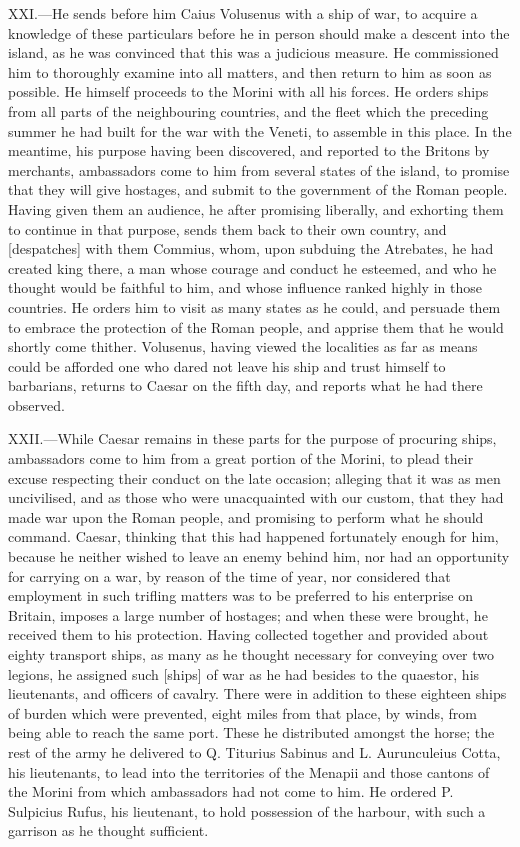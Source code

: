 XXI.—He sends before him Caius Volusenus with a ship of war, to acquire
a knowledge of these particulars before he in person should make a
descent into the island, as he was convinced that this was a judicious
measure. He commissioned him to thoroughly examine into all matters, and
then return to him as soon as possible. He himself proceeds to the
Morini with all his forces. He orders ships from all parts of the
neighbouring countries, and the fleet which the preceding summer he had
built for the war with the Veneti, to assemble in this place. In the
meantime, his purpose having been discovered, and reported to the
Britons by merchants, ambassadors come to him from several states of the
island, to promise that they will give hostages, and submit to the
government of the Roman people. Having given them an audience, he after
promising liberally, and exhorting them to continue in that purpose,
sends them back to their own country, and [despatches] with them
Commius, whom, upon subduing the Atrebates, he had created king there, a
man whose courage and conduct he esteemed, and who he thought would be
faithful to him, and whose influence ranked highly in those countries.
He orders him to visit as many states as he could, and persuade them to
embrace the protection of the Roman people, and apprise them that he
would shortly come thither. Volusenus, having viewed the localities as
far as means could be afforded one who dared not leave his ship and
trust himself to barbarians, returns to Caesar on the fifth day, and
reports what he had there observed.

XXII.—While Caesar remains in these parts for the purpose of procuring
ships, ambassadors come to him from a great portion of the Morini, to
plead their excuse respecting their conduct on the late occasion;
alleging that it was as men uncivilised, and as those who were
unacquainted with our custom, that they had made war upon the Roman
people, and promising to perform what he should command. Caesar,
thinking that this had happened fortunately enough for him, because he
neither wished to leave an enemy behind him, nor had an opportunity for
carrying on a war, by reason of the time of year, nor considered that
employment in such trifling matters was to be preferred to his
enterprise on Britain, imposes a large number of hostages; and when
these were brought, he received them to his protection. Having collected
together and provided about eighty transport ships, as many as he
thought necessary for conveying over two legions, he assigned such
[ships] of war as he had besides to the quaestor, his lieutenants, and
officers of cavalry. There were in addition to these eighteen ships of
burden which were prevented, eight miles from that place, by winds, from
being able to reach the same port. These he distributed amongst the
horse; the rest of the army he delivered to Q. Titurius Sabinus and L.
Aurunculeius Cotta, his lieutenants, to lead into the territories of the
Menapii and those cantons of the Morini from which ambassadors had not
come to him. He ordered P. Sulpicius Rufus, his lieutenant, to hold
possession of the harbour, with such a garrison as he thought
sufficient.

